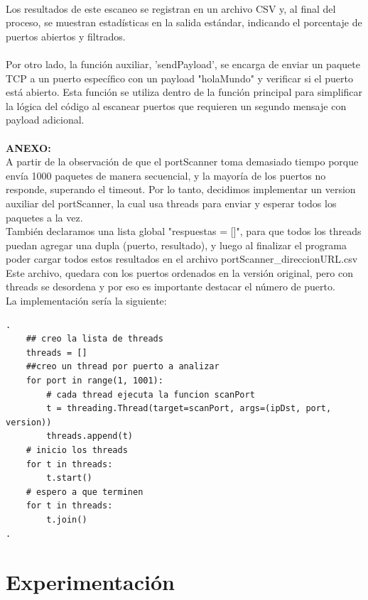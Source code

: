 \documentclass{article}
\begin{document}
        \\
        Los resultados de este escaneo se registran en un archivo CSV y, al final del proceso, se muestran estadísticas en la salida estándar, indicando el porcentaje de puertos abiertos y filtrados.\\        
        \\
        Por otro lado, la función auxiliar, 'sendPayload', se encarga de enviar un paquete TCP a un puerto específico con un payload "holaMundo" y verificar si el puerto está abierto. Esta función se utiliza dentro de la función principal para simplificar la lógica del código al escanear puertos que requieren un segundo mensaje con payload adicional.\\
        \\
        
        \textbf{ANEXO:} \\
        A partir de la observación de que el portScanner toma demasiado tiempo porque envía 1000 paquetes de manera secuencial, y la mayoría de los puertos no responde, superando el timeout. Por lo tanto, decidimos implementar un version auxiliar del portScanner, la cual usa threads para enviar y esperar todos los paquetes a la vez.\\ 
        También declaramos una lista global "respuestas = []", para que todos los threads puedan agregar una dupla (puerto, resultado), y luego al finalizar el programa poder cargar todos estos resultados en el archivo portScanner\_direccionURL.csv 
        Este archivo, quedara con los puertos ordenados en la versión original, pero con threads se desordena y por eso es importante destacar el número de puerto.\\
        La implementación sería la siguiente:\\
        \vspace{0.2cm}
        \begin{lstlisting}[style=python]
.
    ## creo la lista de threads
    threads = []
    ##creo un thread por puerto a analizar
    for port in range(1, 1001):
        # cada thread ejecuta la funcion scanPort
        t = threading.Thread(target=scanPort, args=(ipDst, port, version))
        threads.append(t)
    # inicio los threads
    for t in threads:
        t.start()
    # espero a que terminen
    for t in threads:
        t.join()
.
        \end{lstlisting}

\section{Experimentación}
\vspace{0.5cm}
\end{document}
